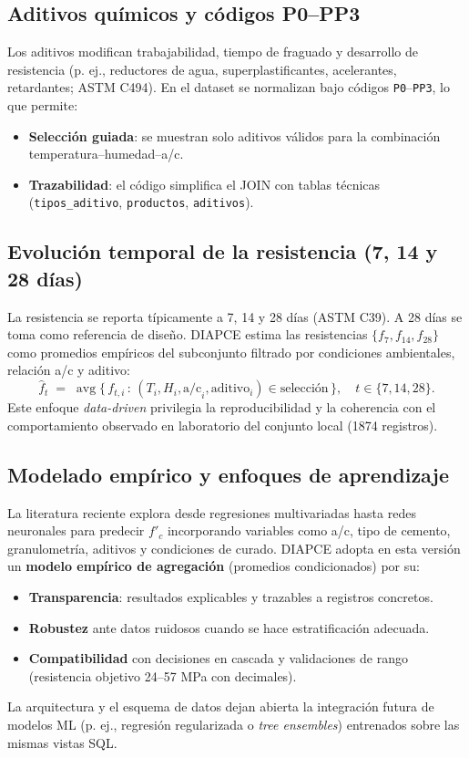 \subsection{Aditivos químicos y códigos P0–PP3}
Los aditivos modifican trabajabilidad, tiempo de fraguado y desarrollo de resistencia (p. ej., reductores de agua, superplastificantes, acelerantes, retardantes; ASTM C494). En el dataset se normalizan bajo códigos \texttt{P0}–\texttt{PP3}, lo que permite:
\begin{itemize}
    \item \textbf{Selección guiada}: se muestran solo aditivos válidos para la combinación temperatura–humedad–a/c.
    \item \textbf{Trazabilidad}: el código simplifica el JOIN con tablas técnicas (\texttt{tipos\_aditivo}, \texttt{productos}, \texttt{aditivos}).
\end{itemize}

\subsection{Evolución temporal de la resistencia (7, 14 y 28 días)}
La resistencia se reporta típicamente a 7, 14 y 28 días (ASTM C39). A 28 días se toma como referencia de diseño. DIAPCE estima las resistencias $\{f_7, f_{14}, f_{28}\}$ como promedios empíricos del subconjunto filtrado por condiciones ambientales, relación a/c y aditivo:
\[
\hat f_{t} \;=\; \operatorname{avg}\{\, f_{t,i}\,:\, (T_i,H_i,\mathrm{a/c}_i,\mathrm{aditivo}_i)\in \text{selección}\,\},\quad t\in\{7,14,28\}.
\]
Este enfoque \textit{data-driven} privilegia la reproducibilidad y la coherencia con el comportamiento observado en laboratorio del conjunto local (1874 registros).

\subsection{Modelado empírico y enfoques de aprendizaje}
La literatura reciente explora desde regresiones multivariadas hasta redes neuronales para predecir $f'_c$ incorporando variables como a/c, tipo de cemento, granulometría, aditivos y condiciones de curado. DIAPCE adopta en esta versión un \textbf{modelo empírico de agregación} (promedios condicionados) por su:
\begin{itemize}
    \item \textbf{Transparencia}: resultados explicables y trazables a registros concretos.
    \item \textbf{Robustez} ante datos ruidosos cuando se hace estratificación adecuada.
    \item \textbf{Compatibilidad} con decisiones en cascada y validaciones de rango (resistencia objetivo 24–57 MPa con decimales).
\end{itemize}
La arquitectura y el esquema de datos dejan abierta la integración futura de modelos ML (p. ej., regresión regularizada o \textit{tree ensembles}) entrenados sobre las mismas vistas SQL.

